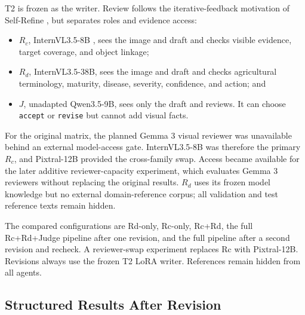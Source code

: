 \documentclass[11pt]{article}
\newcommand{\Rc}{\ensuremath{R_{c}}}
\newcommand{\Rd}{\ensuremath{R_{d}}}
\newcommand{\Judge}{\ensuremath{J}}
\begin{document}
T2 is frozen as the writer. Review follows the iterative-feedback motivation of
Self-Refine \citep{madaan2023selfrefine}, but separates roles and evidence
access:

\begin{itemize}[leftmargin=*,nosep]
    \item \Rc, InternVL3.5-8B \citep{wang2025internvl}, sees the image and draft
    and checks visible evidence, target coverage, and object linkage;
    \item \Rd, InternVL3.5-38B, sees the image and draft and checks agricultural
    terminology, maturity, disease, severity, confidence, and action; and
    \item \Judge, unadapted Qwen3.5-9B, sees only the draft and reviews. It can
    choose \texttt{accept} or \texttt{revise} but cannot add visual facts.
\end{itemize}

For the original matrix, the planned Gemma 3 visual reviewer was unavailable
behind an external model-access gate. InternVL3.5-8B was therefore the primary
\Rc{}, and Pixtral-12B provided the cross-family swap. Access became available
for the later additive reviewer-capacity experiment, which evaluates Gemma 3
reviewers without replacing the original results. \Rd{} uses its frozen model
knowledge but no external domain-reference corpus; all validation and test
reference texts remain hidden.

The compared configurations are Rd-only, Rc-only, Rc+Rd, the full
Rc+Rd+Judge pipeline after one revision, and the full pipeline after a second
revision and recheck. A reviewer-swap experiment replaces Rc with Pixtral-12B.
Revisions always use the frozen T2 LoRA writer. References remain hidden from
all agents.

\subsection{Structured Results After Revision}
\end{document}
